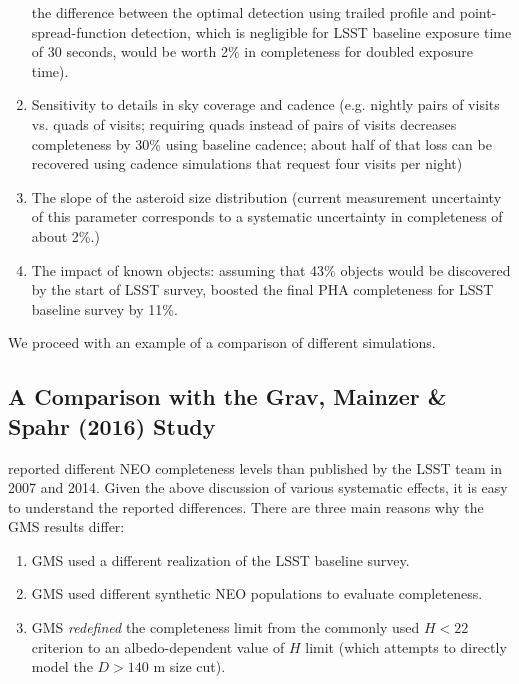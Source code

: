 \begin{enumerate}
          the difference between the optimal detection using trailed profile and point-spread-function 
          detection, which is negligible for LSST baseline exposure time of 30 seconds, would be worth 2\%
          in completeness for doubled exposure time). 
\item Sensitivity to details in sky coverage and cadence (e.g. nightly pairs of visits vs. quads of visits;
          requiring quads instead of pairs of visits decreases completeness by 30\% using baseline cadence; 
          about half of that loss can be recovered using cadence simulations that request four visits per night) 
\item The slope of the asteroid size distribution (current measurement uncertainty of this parameter 
          corresponds to a systematic uncertainty in completeness of about 2\%.)
\item The impact of known objects: assuming that 43\% objects would be discovered by the start of
          LSST survey, \cite{GMS2016} boosted the final PHA completeness for LSST baseline survey by 11\%. 
\end{enumerate} 

We proceed with an example of a comparison of different simulations. 


\subsection{A Comparison with the Grav, Mainzer \& Spahr (2016) Study \label{sec:GMS}}

\cite[hereafter GMS]{GMS2016} reported different NEO completeness levels than published by the LSST team
in 2007 and 2014. Given the above discussion of various systematic effects, it is easy to understand 
the reported differences. There are three main reasons why the GMS results differ:
\begin{enumerate}
\item GMS used a different realization of the LSST baseline survey.
\item GMS used different synthetic NEO populations to evaluate completeness.
\item GMS {\it redefined} the completeness limit from the commonly
  used $H<22$ criterion to an albedo-dependent value of $H$ limit (which
  attempts to directly model the $D>140$ m size cut). 
\end{enumerate}

